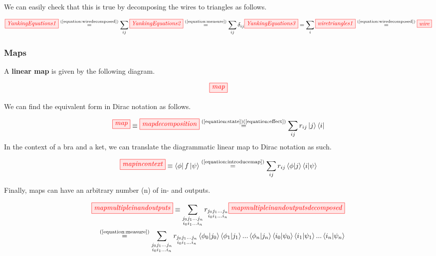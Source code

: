 \documentclass[]{article}
\newcommand{\equaltext}[1]{\ensuremath{\stackrel{\text{#1}}{=}}}
\begin{document}
We can easily check that this is true by decomposing the wires to triangles as follows.

\begin{equation}
\tikzfig{YankingEquations1} \equaltext{(\ref{equation:wiredecomposed})} \sum\limits_{ij} \tikzfig{YankingEquations2} \equaltext{(\ref{equation:measure})} \sum\limits_{ij} \delta_{ij} \tikzfig{YankingEquations3} = \sum\limits_{i} \tikzfig{wiretriangles1} \equaltext{(\ref{equation:wiredecomposed})} \tikzfig{wire}
\end{equation}

\subsubsection{Maps}
\label{maps}

A \textbf{linear map} is given by the following diagram.

\begin{equation}
\tikzfig{map}
\end{equation}

We can find the equivalent form in Dirac notation as follows.

\begin{equation}
\label{equation:introducemap}
\tikzfig{map} \equiv \tikzfig{mapdecomposition} \equaltext{(\ref{equation:state})(\ref{equation:effect})} \sum_{ij}r_{ij}\ket{j}\bra{i}
\end{equation}
\newpage
In the context of a bra and a ket, we can translate the diagrammatic linear map to Dirac notation as such.

\begin{equation}
\tikzfig{mapincontext} \equiv \bra{\phi}f\ket{\psi} \equaltext{(\ref{equation:introducemap})} \sum_{ij}r_{ij} \bra{\phi}\ket{j}\bra{i}\ket{\psi}
\end{equation}

Finally, maps can have an arbitrary number (n) of in- and outputs.

\begin{equation} 
\begin{aligned}
	\tikzfig{mapmultipleinandoutputs} \equiv \sum\limits_{\substack{j_0 j_1 ... j_n \\ i_0 i_1 ... i_n}} r_{\substack{j_0 j_1 ... j_n \\ i_0 i_1 ... i_n}} \tikzfig{mapmultipleinandoutputsdecomposed} \\ \equaltext{(\ref{equation:measure})} \sum\limits_{\substack{j_0 j_1 ... j_n \\ i_0 i_1 ... i_n}} r_{\substack{j_0 j_1 ... j_n \\ i_0 i_1 ... i_n}} \bra{\phi_0}\ket{j_0} \bra{\phi_1}\ket{j_1} ... \bra{\phi_n}\ket{j_n} \bra{i_0}\ket{\psi_0}\bra{i_1}\ket{\psi_1}...\bra{i_n}\ket{\psi_n}
\end{aligned}
\end{equation}
\end{document}
